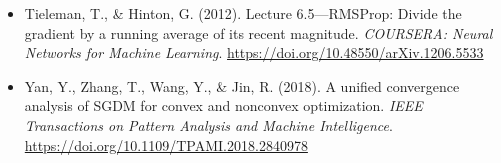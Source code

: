 \documentclass{article}
\begin{document}
\begin{itemize}
	\item Tieleman, T., \& Hinton, G. (2012). Lecture 6.5—RMSProp: Divide the gradient by a running average of its recent magnitude. \textit{COURSERA: Neural Networks for Machine Learning}. \url{https://doi.org/10.48550/arXiv.1206.5533}
	\item Yan, Y., Zhang, T., Wang, Y., \& Jin, R. (2018). A unified convergence analysis of SGDM for convex and nonconvex optimization. \textit{IEEE Transactions on Pattern Analysis and Machine Intelligence}. \url{https://doi.org/10.1109/TPAMI.2018.2840978}
\end{itemize}

	
\end{document}
